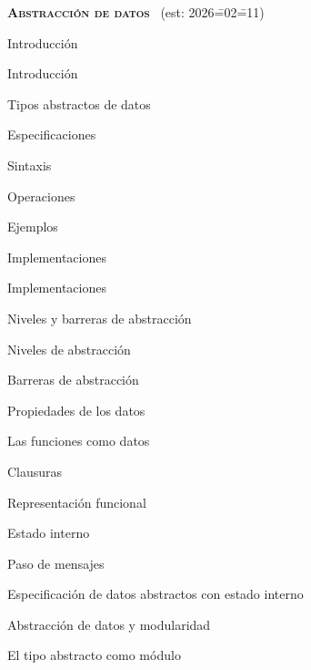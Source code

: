 \begin{longenum}
    \item \textbf{\textsc{Abstracción de datos}} \ (est: 2026\==02\==11)
    \begin{longenum}
        \item Introducción
        \begin{longenum}
            \item Introducción
            \item Tipos abstractos de datos
        \end{longenum}
        \item Especificaciones
        \begin{longenum}
            \item Sintaxis
            \item Operaciones
            \item Ejemplos
        \end{longenum}
        \item Implementaciones
        \begin{longenum}
            \item Implementaciones
        \end{longenum}
        \item Niveles y barreras de abstracción
        \begin{longenum}
            \item Niveles de abstracción
            \item Barreras de abstracción
            \item Propiedades de los datos
        \end{longenum}
        \item Las funciones como datos
        \begin{longenum}
            \item Clausuras
            \item Representación funcional
            \item Estado interno
            \item Paso de mensajes
            \item Especificación de datos abstractos con estado interno
        \end{longenum}
        \item Abstracción de datos y modularidad
        \begin{longenum}
            \item El tipo abstracto como módulo
        \end{longenum}
    \end{longenum}

\end{longenum}
